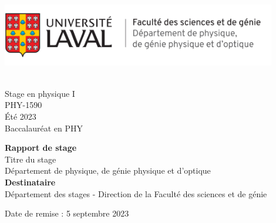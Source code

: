 \documentclass[12pt]{article} 	%
\newcommand\titreDuCours{Stage en physique I}
\newcommand\sigleCoursStage{PHY-1590}
\newcommand\session{Été 2023}
\newcommand\acronymeDuBac{PHY}
\newcommand\titreStage{Titre du stage}
\newcommand\nomCompagnie{Département de physique, de génie physique et d'optique}
\newcommand\dateRemise{5 septembre 2023}
\newcommand\distanceEnteteEtNomStage{4cm}
\newcommand\distanceTypeRapportEtDestinataire{5cm}
\begin{document}
\thispagestyle{empty}
\begin{minipage}[t]{8.5cm}
    \vspace{0pt}
    \begin{flushleft}
        \hspace{-1cm}\includegraphics[width=12cm]{img/Logo_Ulaval.png}\\
    \end{flushleft}
\end{minipage}
\begin{minipage}[t]{8.5cm}
    \begin{flushright}
        \hspace*{2cm} \\
        \hspace*{1cm}\titreDuCours\\
        \hspace*{1cm}\sigleCoursStage\\
        \hspace*{1cm}\session\\
        \hspace*{1cm}Baccalauréat en {\acronymeDuBac}\\
    \end{flushright}
\end{minipage}

\vspace{\distanceEnteteEtNomStage}
\begin{center}
    
    \fontsize{14.4}{14.4}\large \textbf{Rapport de stage}\\
    \vspace{1cm}
    \large {\titreStage}  \\
\vspace{0.2cm}
    {\nomCompagnie} \\
    \vspace{\distanceTypeRapportEtDestinataire}
    \fontsize{14.4}{14.4}\textbf {Destinataire}\\
    \large Département des stages  - Direction de la Faculté des sciences et de génie \\
\end{center}
\vspace{2cm}
\begin{flushleft}
    Date de remise : {\dateRemise}
\end{flushleft}
\end{document}
